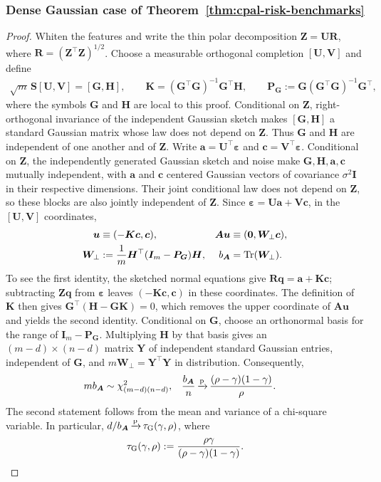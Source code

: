 \documentclass{article}
\theoremstyle{plain}
\theoremstyle{definition}
\theoremstyle{definition}
\newcommand{\boldzero}{\mathbf{0}}
\newcommand{\limp}{{\,\smash{\xrightarrow{\mathrm{p}}}}\,}
\DeclareMathOperator{\trace}{Tr}
\def\mathbold{\boldsymbol}
\def\cal{\mathcal}
\def\ba{\mathbold{a}}\def\bfa{\mathbold{a}}\def\ahat{\widehat{a}}\def\atil{\widetilde{a}}
\def\bA{\mathbold{A}}\def\calA{{\cal A}}\def\scrA{{\mathscr A}}\def\Ahat{\widehat{A}}\def\Atil{{\widetilde A}}
\def\bc{\mathbold{c}}\def\chat{\widehat{c}}\def\ctil{\widetilde{c}}
\def\bG{\mathbold{G}}\def\calG{{\cal G}}\def\scrG{{\mathscr G}}\def\Ghat{\widehat{G}}\def\Gtil{{\widetilde G}}
\def\bH{\mathbold{H}}\def\calH{{\cal H}}\def\scrH{{\mathscr H}}\def\Hhat{\widehat{H}}\def\Htil{{\widetilde H}}
\def\bI{\mathbold{I}}\def\hbI{{\widehat{\bI}}}\def\tbI{{\widetilde{\bI}}}
\def\bK{\mathbold{K}}\def\hbK{{\widehat{\bK}}}\def\tbK{{\widetilde{\bK}}}
\def\bP{\mathbold{P}}\def\hbP{{\widehat{\bP}}}\def\tbP{{\widetilde{\bP}}}
\def\bq{\mathbold{q}}\def\qhat{\widehat{q}}\def\qtil{\widetilde{q}}\def\qbar{{\overline q}}
\def\bR{\mathbold{R}}\def\hbR{{\widehat{\bR}}}\def\tbR{{\widetilde{\bR}}}
\def\bS{\mathbold{S}}\def\hbS{{\widehat{\bS}}}\def\tbS{{\widetilde{\bS}}}
\def\bu{\mathbold{u}}\def\uhat{\widehat{u}}\def\util{\widetilde{u}}\def\ubar{{\overline u}}
\def\bU{\mathbold{U}}\def\hbU{{\widehat{\bU}}}\def\tbU{{\widetilde{\bU}}}
\def\bV{\mathbold{V}}\def\hbV{{\widehat{\bV}}}\def\tbV{{\widetilde{\bV}}}
\def\bW{\mathbold{W}}\def\hbW{{\widehat{\bW}}}\def\tbW{{\widetilde{\bW}}}
\def\bY{\mathbold{Y}}\def\hbY{{\widehat{\bY}}}\def\tbY{{\widetilde{\bY}}}
\def\bZ{\mathbold{Z}}\def\hbZ{{\widehat{\bZ}}}\def\tbZ{{\widetilde{\bZ}}}
\def\ep{\varepsilon}\def\eps{\epsilon}\def\veps{\varepsilon}
\def\bep{ {\mathbold{\ep} }}
\begin{document}
\subsubsection{Dense Gaussian case of Theorem~\ref{thm:cpal-risk-benchmarks}}
\label{app:dense-Gaussian-proof}

\begin{proof}
Whiten the features and write the thin polar decomposition
$\bZ=\bU\bR$, where $\bR=(\bZ^\top\bZ)^{1/2}$.
Choose a measurable orthogonal completion $[\bU,\bV]$ and define
\begin{align*}
    \sqrt m\,\bS[\bU,\bV]=[\bG,\bH],
    \qquad
    \bK=(\bG^\top\bG)^{-1}\bG^\top\bH,
    \qquad
    \bP_{\bG}:=\bG(\bG^\top\bG)^{-1}\bG^\top,
\end{align*}
where the symbols $\bG$ and $\bH$ are local to this proof. Conditional
on $\bZ$, right-orthogonal invariance of the independent Gaussian
sketch makes $[\bG,\bH]$ a standard Gaussian matrix whose law does not
depend on $\bZ$. Thus $\bG$ and $\bH$ are independent of one another
and of $\bZ$.      Write $\ba=\bU^\top\bep$ and $\bc=\bV^\top\bep$.
Conditional on $\bZ$, the independently generated Gaussian sketch and noise
make $\bG,\bH,\ba,\bc$ mutually independent, with $\ba$ and $\bc$ centered
Gaussian vectors of covariance $\sigma^2\bI$ in their respective dimensions.
Their joint conditional law does not depend on $\bZ$, so these blocks are
also jointly independent of $\bZ$. Since $\bep=\bU\ba+\bV\bc$, in the
$[\bU,\bV]$ coordinates, 
\begin{align}
    \bu&\equiv(-\bK\bc,\bc),
    &
    \bA\bu&\equiv(\boldzero,\bW_{\perp}\bc),
    \label{eq:Gaussian-coordinate-decomp}\\
    \bW_{\perp}&:=\frac{1}{m}\bH^\top(\bI_m-\bP_{\bG})\bH,
    & b_{\bA}&=\trace(\bW_{\perp}).
    \notag
\end{align}
To see the first identity, the sketched normal equations give
$\bR\bq=\ba+\bK\bc$; subtracting $\bZ\bq$ from
$\bep$ leaves $(-\bK\bc,\bc)$ in these coordinates.
The definition of $\bK$ then gives
$\bG^\top(\bH-\bG\bK)=0$, which removes the upper coordinate of
$\bA\bu$ and yields the second identity.
Conditional on $\bG$, choose an orthonormal basis for the range of
$\bI_m-\bP_{\bG}$. Multiplying $\bH$ by that basis gives an
$(m-d)\times(n-d)$ matrix $\bY$ of independent standard Gaussian entries,
independent of $\bG$, and $m\bW_\perp=\bY^\top\bY$ in distribution.
Consequently,
\begin{align}
    mb_{\bA}&\sim\chi^2_{(m-d)(n-d)},
    &
    \frac{b_{\bA}}n
    &\limp\frac{(\rho-\gamma)(1-\gamma)}{\rho}.
    \label{eq:Gaussian-W-traces}
\end{align}
The second statement follows from the mean and variance of a chi-square
variable. In particular,
$d/b_{\bA}\limp\tau_{\rm G}(\gamma,\rho)$, where
\begin{align*}
    \tau_{\rm G}(\gamma,\rho)
    :=\frac{\rho\gamma}{(\rho-\gamma)(1-\gamma)}.
\end{align*}


\end{proof}
\end{document}
